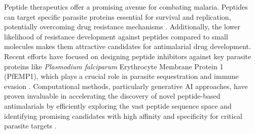 Peptide therapeutics offer a promising avenue for combating malaria. Peptides can target specific
parasite proteins essential for survival and replication, potentially overcoming drug resistance
mechanisms \cite{li2009pfemp1}. Additionally, the lower likelihood of resistance development against
peptides compared to small molecules makes them attractive candidates for antimalarial drug
development. Recent efforts have focused on designing peptide inhibitors against key parasite
proteins like \textit{Plasmodium falciparum} Erythrocyte Membrane Protein 1 (PfEMP1), which plays a
crucial role in parasite sequestration and immune evasion \cite{jensen2020pfemp1}. Computational methods, particularly
generative AI approaches, have proven invaluable in accelerating the discovery of novel
peptide-based antimalarials by efficiently exploring the vast peptide sequence space and identifying
promising candidates with high affinity and specificity for critical parasite targets
\cite{chang2022rational}.
